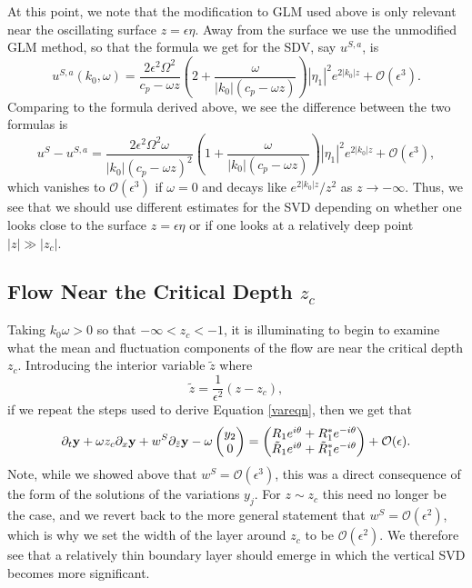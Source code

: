 \documentclass{JFM_Style/jfm}
\newcommand{\bp}{\begin{pmatrix}}
\newcommand{\ep}{\end{pmatrix}}
\newcommand{\pd}{\partial}
\begin{document}
At this point, we note that the modification to GLM used above is only relevant near the oscillating surface $z=\epsilon \eta$.  Away from the surface we use the unmodified GLM method, so that the formula we get for the SDV, say $u^{S,a}$, is 
\[
u^{S,a}(k_{0},\omega) =  \frac{2\epsilon^{2} \Omega^{2}}{c_{p}-\omega z} \left( 2 +  \frac{\omega}{|k_{0}|(c_{p} - \omega z )} \right)\left|\eta_{1}\right|^{2} e^{2|k_{0}|z} + \mathcal{O}(\epsilon^{3}). 
\]
Comparing to the formula derived above, we see the difference between the two formulas is 
\[
u^{S} - u^{S,a} =  \frac{2\epsilon^{2} \Omega^{2}\omega}{|k_{0}|\left(c_{p}-\omega z\right)^{2}}\left(1 + \frac{\omega}{|k_{0}|\left(c_{p}-\omega z\right)}\right) \left|\eta_{1}\right|^{2} e^{2|k_{0}|z} + \mathcal{O}(\epsilon^{3}),
\]
which vanishes to $\mathcal{O}(\epsilon^{3})$ if $\omega=0$ and decays like $e^{2|k_{0}|z}/z^{2}$ as $z\rightarrow -\infty$.  Thus, we see that we should use different estimates for the SVD depending on whether one looks close to the surface $z=\epsilon \eta$ or if one looks at a relatively deep point $|z|\gg |z_{c}|$. 

\subsection{Flow Near the Critical Depth $z_{c}$}
Taking $k_{0}\omega >0$ so that $-\infty<z_{c}<-1$, it is illuminating to begin to examine what the mean and fluctuation components of the flow are near the critical depth $z_{c}$.  Introducing the interior variable $\tilde{z}$ where
$$
\tilde{z} = \frac{1}{\epsilon^{2}}\left(z - z_{c} \right), 
$$
if we repeat the steps used to derive Equation \eqref{vareqn}, then we get that
\begin{equation}
\pd_{t}{\bf y} + \omega z_{c} \pd_{x}{\bf y}  + w^{S}\pd_{\tilde{z}}{\bf y} - \omega \bp y_{2}\\ 0 \ep = \bp R_{1}e^{i\theta}+R^{\ast}_{1}e^{-i\theta}\\ \tilde{R}_{1}e^{i\theta}+\tilde{R}^{\ast}_{1}e^{-i\theta} \ep + \mathcal{O}(\epsilon).
\label{modvareqn}
\end{equation}
 Note, while we showed above that $w^{S}=\mathcal{O}(\epsilon^{3})$, this was a direct consequence of the form of the solutions of the variations $y_{j}$.  For $z\sim z_{c}$ this need no longer be the case, and we revert back to the more general statement that  $w^{S}=\mathcal{O}(\epsilon^{2})$, which is why we set the width of the layer around $z_{c}$ to be $\mathcal{O}(\epsilon^{2})$.  We therefore see that a relatively thin boundary layer should emerge in which the vertical SVD becomes more significant.  
 
\end{document}
